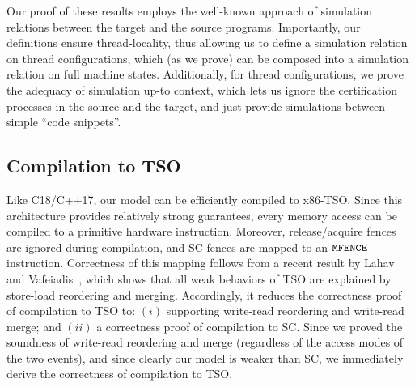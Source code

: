 Our proof of these results employs the well-known approach of simulation relations between the target and the source programs.
Importantly, our definitions ensure thread-locality, thus allowing us to define a simulation relation on thread configurations, which (as we prove)
can be composed into a simulation relation on full machine states.
Additionally, for thread configurations, we prove the adequacy of simulation up-to context,
which lets us ignore the certification processes in the source and the target, 
and just provide simulations between simple ``code snippets''.



\subsection{Compilation to TSO}
\label{sec:compilation_TSO}

Like C18/C++17, our model can be efficiently compiled to x86-TSO.
Since this architecture provides relatively strong guarantees,
every memory access can be compiled to a primitive hardware instruction.
Moreover, release/acquire fences are ignored during compilation,
and SC fences are mapped to an $\texttt{MFENCE}$ instruction.
Correctness of this mapping follows from a recent result by Lahav and Vafeiadis~\cite{fm16},
which shows that all weak behaviors of TSO are explained by store-load reordering and merging.
Accordingly, it reduces the correctness proof of compilation to TSO to:
$(i)$ supporting write-read reordering and write-read merge;
and $(ii)$ a correctness proof of compilation to SC.
Since we proved the soundness of write-read reordering and merge 
(regardless of the access modes of the two events),
and since clearly our model is weaker than SC,
we immediately derive the correctness of compilation to TSO.



